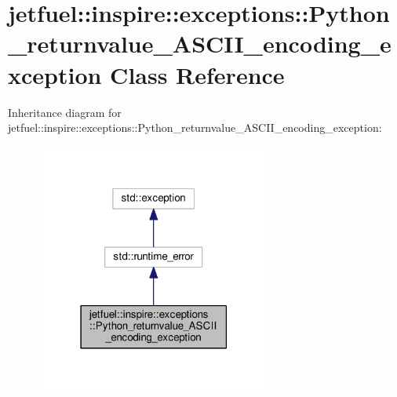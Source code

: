 \hypertarget{classjetfuel_1_1inspire_1_1exceptions_1_1Python__returnvalue__ASCII__encoding__exception}{}\section{jetfuel\+:\+:inspire\+:\+:exceptions\+:\+:Python\+\_\+returnvalue\+\_\+\+A\+S\+C\+I\+I\+\_\+encoding\+\_\+exception Class Reference}
\label{classjetfuel_1_1inspire_1_1exceptions_1_1Python__returnvalue__ASCII__encoding__exception}


Inheritance diagram for jetfuel\+:\+:inspire\+:\+:exceptions\+:\+:Python\+\_\+returnvalue\+\_\+\+A\+S\+C\+I\+I\+\_\+encoding\+\_\+exception\+:
\nopagebreak
\begin{figure}[H]
\begin{center}
\leavevmode
\includegraphics[width=219pt]{classjetfuel_1_1inspire_1_1exceptions_1_1Python__returnvalue__ASCII__encoding__exception__inherit__graph}
\end{center}
\end{figure}


